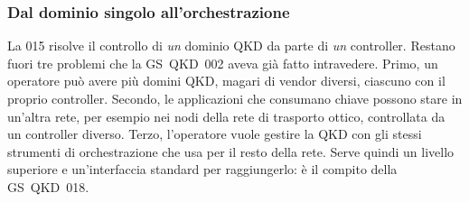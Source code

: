\subsubsection{Dal dominio singolo all'orchestrazione}

La 015 risolve il controllo di \emph{un} dominio QKD da parte di \emph{un}
controller. Restano fuori tre problemi che la GS~QKD~002 aveva già fatto
intravedere. Primo, un operatore può avere più domini QKD, magari di vendor
diversi, ciascuno con il proprio controller. Secondo, le applicazioni che
consumano chiave possono stare in un'altra rete, per esempio nei nodi della
rete di trasporto ottico, controllata da un controller diverso. Terzo,
l'operatore vuole gestire la QKD con gli stessi strumenti di orchestrazione
che usa per il resto della rete. Serve quindi un livello superiore e
un'interfaccia standard per raggiungerlo: è il compito della GS~QKD~018.
